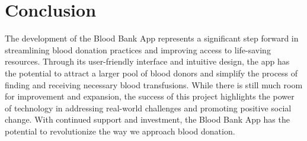 \documentclass{article}
\begin{document}
\section{Conclusion}
The development of the Blood Bank App represents a significant step forward in streamlining
blood donation practices and improving access to life-saving resources. Through its user-friendly
interface and intuitive design, the app has the potential to attract a larger pool of blood donors
and simplify the process of finding and receiving necessary blood transfusions. While there is still
much room for improvement and expansion, the success of this project highlights the power of
technology in addressing real-world challenges and promoting positive social change. With
continued support and investment, the Blood Bank App has the potential to revolutionize the
way we approach blood donation.
\end{document}
